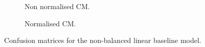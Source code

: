 \begin{figure}[ht]
    \centering
    \begin{subfigure}{.45\textwidth}
        \centering
        \captionsetup{width=0.9\linewidth}
        \captionsetup{justification=centering}
        \caption{Non normalised CM.}
    \end{subfigure}
    \hspace{1cm}
    \begin{subfigure}{.45\textwidth}
        \centering
        \captionsetup{width=0.9\linewidth}
        \captionsetup{justification=centering}
        \caption{Normalised CM.}
    \end{subfigure}
    \captionsetup{width=0.8\linewidth}
    \captionsetup{justification=centering}
    \caption{Confusion matrices for the non-balanced linear baseline model.}
    \label{fig:ma_lbm_cm}
\end{figure}

